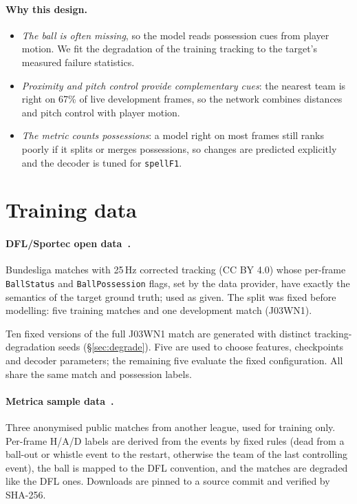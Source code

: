\documentclass[10pt,a4paper,twocolumn]{article}
\newcommand{\spellF}{\texttt{spellF1}}
\begin{document}
\paragraph{Why this design.}
\begin{itemize}
  \item \emph{The ball is often missing}, so the model reads possession cues from player motion.
        We fit the degradation of the training tracking to the target's measured failure statistics.
  \item \emph{Proximity and pitch control provide complementary cues}: the nearest team is right
        on 67\% of live development frames, so the network combines distances and pitch control
        with player motion.
  \item \emph{The metric counts possessions}: a model right on most frames still ranks poorly if it
        splits or merges possessions, so changes are predicted explicitly and the decoder is tuned
        for \spellF.
\end{itemize}

\section{Training data}\label{sec:data}

\paragraph{DFL/Sportec open data~\cite{bassek2025}.} Bundesliga matches with 25\,Hz corrected
tracking (CC BY 4.0) whose per-frame \texttt{BallStatus} and \texttt{BallPossession}
flags, set by the data provider, have exactly the semantics of the target ground truth; used as
given. The split was fixed before modelling: five training matches and one
development match (J03WN1).

Ten fixed versions of the full J03WN1 match are generated with distinct tracking-degradation
seeds (\S\ref{sec:degrade}). Five are used to choose features, checkpoints and decoder parameters;
the remaining five evaluate the fixed configuration. All share the same match and possession labels.

\paragraph{Metrica sample data~\cite{metrica}.} Three anonymised public matches from another league,
used for training only. Per-frame H/A/D labels are derived from the events by fixed rules (dead from a
ball-out or whistle event to the restart, otherwise the team of the last controlling event), the
ball is mapped to the DFL convention, and the matches are degraded like the DFL ones. Downloads
are pinned to a source commit and verified by SHA-256.
\end{document}
